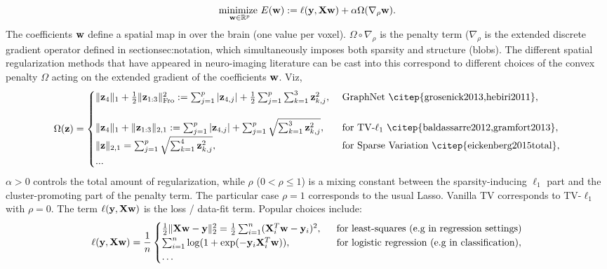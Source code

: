\begin{equation}
  \underset{\mathbf{w} \in \mathbb R^p}{\text{minimize }}E(\mathbf{w}) := \ell(\mathbf{y},\mathbf{X}\mathbf{w}) + \alpha \Omega(\nabla_\rho\mathbf{w}).
    \label{eq:opt_pb}
\end{equation}
The coefficients ${\mathbf{w}}$ define a spatial map in over the brain (one value per voxel).
$\Omega \circ \nabla_\rho$ is the penalty term ($\nabla_\rho$ is the extended discrete gradient operator defined in section{sec:notation}, which simultaneously imposes both sparsity and structure (blobs). The different spatial regularization
methods that have appeared in neuro-imaging literature can be cast into this
correspond to different choices of the convex penalty $\Omega$ acting on the extended gradient of the coefficients $\mathbf{w}$. Viz,
\[
  \begin{split}
  \Omega(\z) = \begin{cases}
      \|\z_4\|_1 + \frac{1}{2}\|\z_{1:3}\|_{\text{Fro}}^2 := \sum_{j=1}^p|\z_{4,j}| + \frac{1}{2}\sum_{j=1}^{p}\sum_{k=1}^3\z_{k,j}^2, &\mbox{ GraphNet  \citep{grosenick2013,hebiri2011}},\\\\
      \|\z_4\|_1 + \|\z_{1:3}\|_{2,1} := \sum_{j=1}^p|\z_{4,j}| + \sum_{j=1}^{p}\sqrt{\sum_{k=1}^3\z_{k,j}^2}, &\mbox{ for TV-$\ell_1$  \citep{baldassarre2012,gramfort2013}},\\
      \|\z\|_{2,1} = \sum_{j=1}^{p}\sqrt{\sum_{k=1}^4\z_{k,j}^2}, &\mbox{ for Sparse Variation  \citep{eickenberg2015total}},\\
      ...
    \end{cases}
  \end{split}
\]
{$\alpha > 0$} controls the total amount of regularization, while
  {$\rho$
    ($0 < \rho \le 1$)} is a
  mixing constant between
  the {sparsity-inducing} $\ell_1$ part and the
  {cluster-promoting} part of the penalty term.
  The particular case {$\rho = 1$} corresponds to the usual Lasso. Vanilla TV   \citep{michel2011tv} corresponds to TV-$\ell_1$ with $\rho = 0$.
The term {$\ell(\mathbf{y},\mathbf{X}\mathbf{w})$} is the
  {loss / data-fit term}. Popular choices include:
  $$
  \ell(\mathbf{y},\mathbf{X}\mathbf{w}) = \frac{1}{n}\begin{cases}\frac{1}{2}\|\mathbf{X}\mathbf{w} - \mathbf{y}\|_2^2 = \frac{1}{2}\sum_{i=1}^n(\mathbf{X}^T_i\mathbf{w} - \mathbf{y}_i)^2,
    &\mbox{ \text{ for least-squares (e.g in regression settings)}}\\
    \sum_{i=1}^n \log(1+\exp(-\mathbf{y}_i\mathbf{X}_i^T\mathbf{w})),
    &\mbox{ \text{ for logistic regression (e.g in classification)}},\\\ldots\end{cases}$$
  
